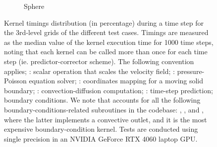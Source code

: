 \documentclass[10pt,a4paper]{article}
\begin{document}
\begin{figure}[!t]
\begin{subfigure}[t]{0.32\linewidth}
    \caption{Sphere\hspace*{2em}}
  \end{subfigure}
  \begin{subfigure}[t]{0.325\linewidth}
    \centering
  \end{subfigure}
  \caption{Kernel timings distribution (in percentage) during a time step for the 3rd-level grids of the different test cases. Timings are measured as the median value of the kernel execution time for 1000 time steps, noting that each kernel can be called more than once for each time step (ie. predictor-corrector scheme). The following convention applies; : scalar operation that scales the velocity field; : pressure-Poisson equation solver; : coordinates mapping for a moving solid boundary; : convection-diffusion computation; : time-step prediction;  boundary conditions. We note that  accounts for all the following boundary-conditions-related subroutines in the codebase: , , and , where the latter implements a convective outlet, and it is the most expensive boundary-condition kernel. Tests are conducted using single precision in an NVIDIA GeForce RTX 4060 laptop GPU.}
\label{fig:profiling}
\end{figure}
\end{document}

